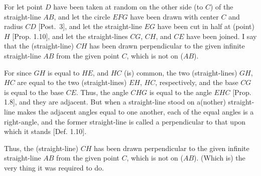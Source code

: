 \begin{Parallel}{}{}
{For let point $D$ have been taken at random on the other side (to $C$) of 
the straight-line $AB$, and let the circle $EFG$ have been drawn
with center $C$ and radius $CD$ [Post.~3], and let the straight-line $EG$ have been cut
in half at (point) $H$ [Prop. 1.10], and let the straight-lines $CG$, $CH$,
and $CE$ have been joined. I say that the  (straight-line) $CH$ has
been drawn  perpendicular to the given infinite straight-line
$AB$ from the given point $C$, which is not on ($AB$).

For since $GH$ is equal to $HE$, and $HC$ (is) common, the two (straight-lines) $GH$, 
$HC$
are equal to the two (straight-lines) $EH$, $HC$, respectively, and the base $CG$ is
equal to the base $CE$. Thus, the angle $CHG$ is equal to the
angle $EHC$ [Prop. 1.8], and they are adjacent. But when a straight-line
stood on a(nother) straight-line makes the adjacent angles equal to one another, each of the equal angles is a right-angle, and the former straight-line is called a perpendicular to that upon which it stands [Def. 1.10].

Thus, the (straight-line) $CH$ has been drawn perpendicular to the given infinite straight-line $AB$ from the given point $C$, which is not
on  ($AB$). (Which is) the very thing it was required to do.}
\end{Parallel}

